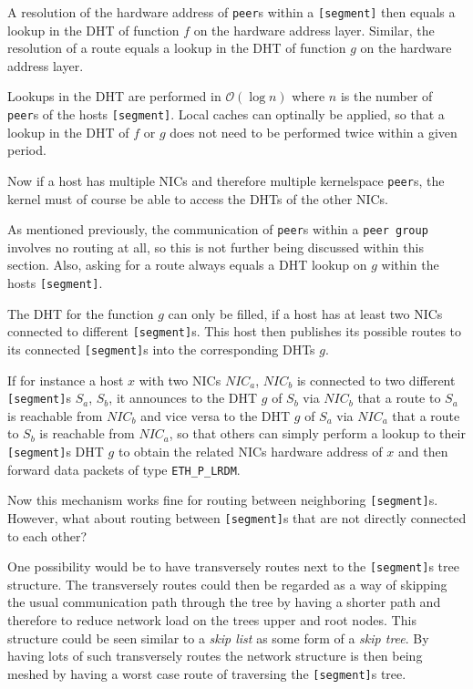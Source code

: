 \documentclass[times,10pt,twocolumn]{article}
\begin{document}
A resolution of the hardware address of \texttt{peer}s within a 
\texttt{[segment]} then equals a lookup in the DHT of function $f$ on the 
hardware address layer. Similar, the resolution of a route equals a lookup 
in the DHT of function $g$ on the hardware address layer.\newline

Lookups in the DHT are performed in $\mathcal{O}(\log{n})$ where $n$ is the number
of \texttt{peer}s of the hosts \texttt{[segment]}. Local caches can optinally 
be applied, so that a lookup in the DHT of $f$ or $g$ does not need to be 
performed twice within a given period.\newline

Now if a host has multiple NICs and therefore multiple kernelspace 
\texttt{peer}s, the kernel must of course be able to access the DHTs 
of the other NICs.

\label{route}
As mentioned previously, the communication of \texttt{peer}s within a
\texttt{peer group} involves no routing at all, so this is not further
being discussed within this section. Also, asking for a route always 
equals a DHT lookup on $g$ within the hosts \texttt{[segment]}.\newline

The DHT for the function $g$ can only be filled, if a host has at least
two NICs connected to different \texttt{[segment]}s. This host then publishes
its possible routes to its connected \texttt{[segment]}s into the corresponding 
DHTs $g$.\newline

If for instance a host $x$ with two NICs $NIC_a$, $NIC_b$ is connected to two 
different \texttt{[segment]}s $S_a$, $S_b$, it announces to the DHT $g$ 
of $S_b$ via $NIC_b$ that a route to $S_a$ is reachable from $NIC_b$ and 
vice versa to the DHT $g$ of $S_a$ via $NIC_a$ that a route to $S_b$ is
reachable from $NIC_a$, so that others can simply perform a lookup to their
\texttt{[segment]}s DHT $g$ to obtain the related NICs hardware address 
of $x$ and then forward data packets of type \texttt{ETH\_P\_LRDM}.\newline

Now this mechanism works fine for routing between neighboring 
\texttt{[segment]}s. However, what about routing between \texttt{[segment]}s
that are not directly connected to each other?\newline

One possibility would be to have transversely routes next to the 
\texttt{[segment]}s tree structure. The transversely routes could then be
regarded as a way of skipping the usual communication path through the tree
by having a shorter path and therefore to reduce network load on the trees
upper and root nodes. This structure could be seen similar to a 
\textit{skip list} as some form of a \textit{skip tree}. By having lots of 
such transversely routes the network structure is then being meshed by
having a worst case route of traversing the \texttt{[segment]}s tree.\newline
\end{document}
